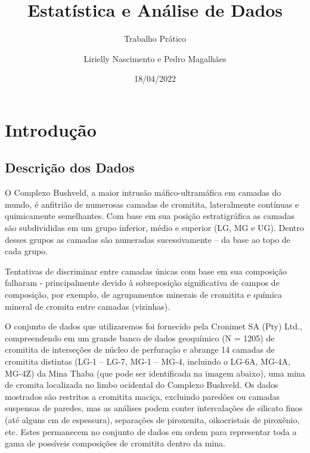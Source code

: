 \documentclass[
]{article}
\title{Estatística e Análise de Dados}
\subtitle{Trabalho Prático}
\author{Lirielly Nascimento e Pedro Magalhães}
\date{18/04/2022}
\begin{document}
\NoBgThispage %

\maketitle



{
\setcounter{tocdepth}{3}
\tableofcontents
}
\newpage

\hypertarget{introduuxe7uxe3o}{%
\section*{Introdução}\label{introduuxe7uxe3o}}

\hypertarget{descriuxe7uxe3o-dos-dados}{%
\subsection*{Descrição dos Dados}\label{descriuxe7uxe3o-dos-dados}}

O Complexo Bushveld, a maior intrusão máfico-ultramáfica em camadas do mundo, é anfitrião de numerosas camadas de cromitita, lateralmente contínuas e quimicamente semelhantes. Com base em sua posição estratigráfica as camadas são subdivididas em um grupo inferior, médio e superior (LG, MG e UG). Dentro desses grupos as camadas são numeradas sucessivamente -- da base ao topo de cada grupo.

Tentativas de discriminar entre camadas únicas com base em sua composição falharam - principalmente devido à sobreposição significativa de campos de composição, por exemplo, de agrupamentos minerais de cromitita e química mineral de cromita entre camadas (vizinhas).

O conjunto de dados que utilizaremos foi fornecido pela Cronimet SA (Pty) Ltd., compreendendo em um grande banco de dados geoquímico (N = 1205) de cromitita de interseções de núcleo de perfuração e abrange 14 camadas de cromitita distintas (LG-1 -- LG-7, MG-1 -- MG-4, incluindo o LG-6A, MG-4A, MG-4Z) da Mina Thaba (que pode ser identificada na imagem abaixo), uma mina de cromita localizada no limbo ocidental do Complexo Bushveld. Os dados mostrados são restritos a cromitita maciça, excluindo paredões ou camadas suspensas de paredes, mas as análises podem conter intercalações de silicato finos (até alguns cm de espessura), separações de piroxenita, oikocristais de piroxênio, etc. Estes permanecem no conjunto de dados em ordem para representar toda a gama de possíveis composições de cromitita dentro da mina.
\end{document}

